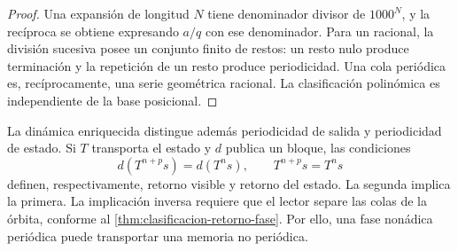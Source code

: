 \begin{proof}
Una expansi\'on de longitud \(N\) tiene denominador divisor de \(1000^N\), y
la rec\'iproca se obtiene expresando \(a/q\) con ese denominador. Para un
racional, la divisi\'on sucesiva posee un conjunto finito de restos: un resto
nulo produce terminaci\'on y la repetici\'on de un resto produce periodicidad.
Una cola peri\'odica es, rec\'iprocamente, una serie geom\'etrica racional. La
clasificaci\'on polin\'omica es independiente de la base posicional.
\end{proof}

La din\'amica enriquecida distingue adem\'as periodicidad de salida y
periodicidad de estado. Si \(T\) transporta el estado y \(d\) publica un
bloque, las condiciones
\[
 d(T^{n+p}s)=d(T^n s),
 \qquad
 T^{n+p}s=T^n s
\]
definen, respectivamente, retorno visible y retorno del estado. La segunda
implica la primera. La implicaci\'on inversa requiere que el lector separe las
colas de la órbita, conforme al
\cref{thm:clasificacion-retorno-fase}. Por ello, una fase non\'adica peri\'odica
puede transportar una memoria no peri\'odica.

